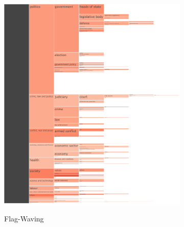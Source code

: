 \begin{figure}[!htbp]
\begin{subfigure}{0.45\textwidth}
		\href{https://martinomensio.github.io/phd-project/figures/baly_iptc_weighted_prop_tech.html#Flag-Waving}{\includegraphics[trim={2.65cm 0cm 0cm 0cm},clip,width=\linewidth]{figures/baly_iptc_weighted_prop_tech_Flag-Waving.pdf}}
		\caption{Flag-Waving}
            \label{fig:baly_iptc_weighted_prop_tech_Flag-Waving}
	\end{subfigure}
	\begin{subfigure}{0.45\textwidth}

\end{subfigure}
\end{figure}
